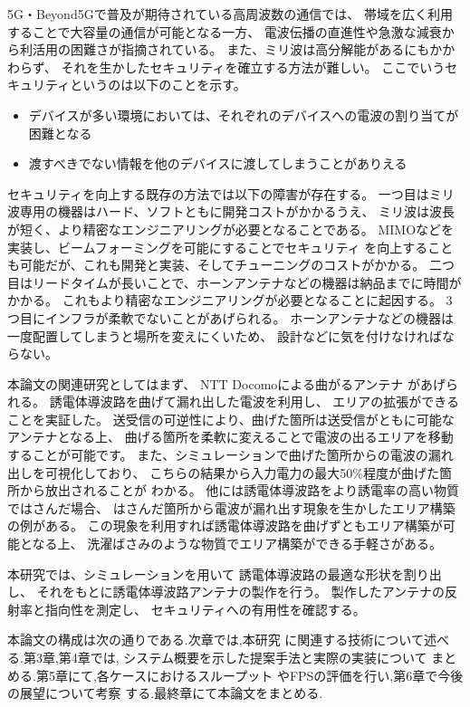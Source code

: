 \documentclass[technicalreport]{ieicej}
\begin{document}
5G・Beyond5Gで普及が期待されている高周波数の通信では、
帯域を広く利用することで大容量の通信が可能となる一方、
電波伝播の直進性や急激な減衰から利活用の困難さが指摘されている。
また、ミリ波は高分解能があるにもかかわらず、
それを生かしたセキュリティを確立する方法が難しい。
ここでいうセキュリティというのは以下のことを示す。

\begin{itemize}
  \item デバイスが多い環境においては、それぞれのデバイスへの電波の割り当てが困難となる
  \item 渡すべきでない情報を他のデバイスに渡してしまうことがありえる
\end{itemize}

セキュリティを向上する既存の方法では以下の障害が存在する。
一つ目はミリ波専用の機器はハード、ソフトともに開発コストがかかるうえ、
ミリ波は波長が短く、より精密なエンジニアリングが必要となることである。
MIMOなどを実装し、ビームフォーミングを可能にすることでセキュリティ
を向上することも可能だが、これも開発と実装、そしてチューニングのコストがかかる。
二つ目はリードタイムが長いことで、ホーンアンテナなどの機器は納品までに時間がかかる。
これもより精密なエンジニアリングが必要となることに起因する。
3つ目にインフラが柔軟でないことがあげられる。
ホーンアンテナなどの機器は一度配置してしまうと場所を変えにくいため、
設計などに気を付けなければならない。

本論文の関連研究としてはまず、
NTT Docomoによる曲がるアンテナ
\cite{bending_antenna} \cite{leaky_wave_antenna_bent_dielectric}
があげられる。
誘電体導波路を曲げて漏れ出した電波を利用し、
エリアの拡張ができることを実証した。
送受信の可逆性により、曲げた箇所は送受信がともに可能なアンテナとなる上、
曲げる箇所を柔軟に変えることで電波の出るエリアを移動することが可能です。
また、シミュレーションで曲げた箇所からの電波の漏れ出しを可視化しており、
こちらの結果から入力電力の最大50\%程度が曲げた箇所から放出されることが
わかる。
他には誘電体導波路をより誘電率の高い物質ではさんだ場合、
はさんだ箇所から電波が漏れ出す現象を生かしたエリア構築の例がある。
この現象を利用すれば誘電体導波路を曲げずともエリア構築が可能となる上、
洗濯ばさみのような物質でエリア構築ができる手軽さがある。

本研究では、シミュレーションを用いて
誘電体導波路の最適な形状を割り出し、
それをもとに誘電体導波路アンテナの製作を行う。
製作したアンテナの反射率と指向性を測定し、
セキュリティへの有用性を確認する。

本論文の構成は次の通りである.次章では,本研究
に関連する技術について述べる.第3章,第4章では,
システム概要を示した提案手法と実際の実装について
まとめる.第5章にて,各ケースにおけるスループット
やFPSの評価を行い,第6章で今後の展望について考察
する.最終章にて本論文をまとめる.
\end{document}
